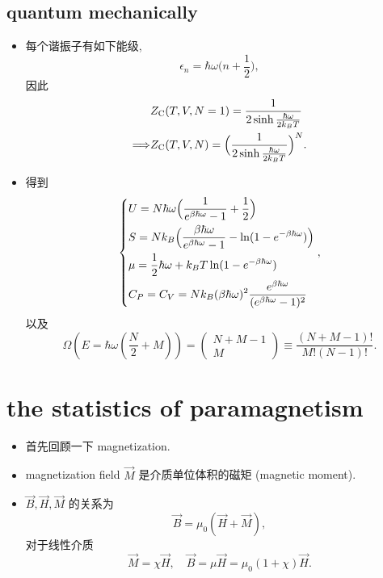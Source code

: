 \subsection{quantum mechanically}
\begin{itemize}
	\item 每个谐振子有如下能级,
	\begin{equation}
		\epsilon_n = \hbar \omega \Big( n + \frac{1}{2} \Big),
	\end{equation}
	因此
	\begin{align}
		& Z_\text{C}(T, V, N = 1) = \frac{1}{2 \sinh \frac{\hbar \omega}{2 k_B T}} \notag \\
		\Longrightarrow & Z_\text{C}(T, V, N) = \Big( \frac{1}{2 \sinh \frac{\hbar \omega}{2 k_B T}} \Big)^N.
	\end{align}
	
	\item 得到
	\begin{equation}
		\begin{dcases}
			U = N \hbar \omega \Big( \frac{1}{e^{\beta \hbar \omega} - 1} + \frac{1}{2} \Big) \\
			S = N k_B \Big( \frac{\beta \hbar \omega}{e^{\beta \hbar \omega} - 1} - \ln(1 - e^{- \beta \hbar \omega}) \Big) \\
			\mu = \frac{1}{2} \hbar \omega + k_B T \ln(1 - e^{- \beta \hbar \omega}) \\
			C_P = C_V = N k_B (\beta \hbar \omega)^2 \frac{e^{\beta \hbar \omega}}{(e^{\beta \hbar \omega} - 1)^2}
		\end{dcases},
	\end{equation}
	以及
	\begin{equation}
		\Omega(E = \hbar \omega ({\textstyle \frac{N}{2}} + M)) = \begin{pmatrix}
			N + M - 1 \\
			M
		\end{pmatrix} \equiv \frac{(N + M - 1)!}{M! (N - 1)!}.
	\end{equation}
\end{itemize}

\section{the statistics of paramagnetism}
\begin{itemize}
	\item 首先回顾一下 magnetization.
	
	\item magnetization field $\vec{M}$ 是介质单位体积的磁矩 (magnetic moment).
	
	\item $\vec{B}, \vec{H}, \vec{M}$ 的关系为
	\begin{equation}
		\vec{B} = \mu_0 (\vec{H} + \vec{M}),
	\end{equation}
	对于线性介质
	\begin{equation}
		\vec{M} = \chi \vec{H}, \quad \vec{B} = \mu \vec{H} = \mu_0 (1 + \chi) \vec{H}.
	\end{equation}
\end{itemize}

